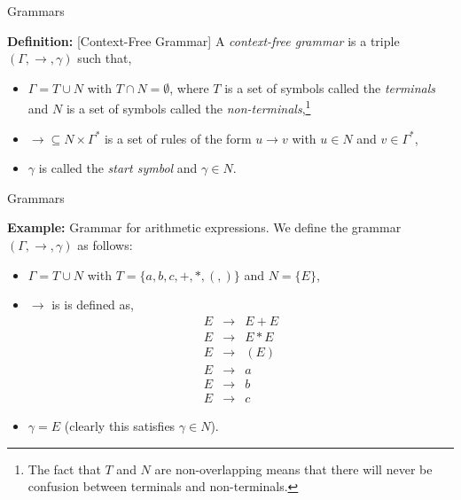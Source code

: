 \documentclass{beamer}
\begin{document}
\begin{frame}[fragile]{Grammars}

\small

{\bf Definition:} [Context-Free Grammar] A {\em context-free grammar} is a triple $(\Gamma,\rightarrow,\gamma)$ such that,
\begin{itemize}
\item
$\Gamma = T \cup N$ with $T\cap N = \emptyset$, where $T$ is a set of symbols called the {\em terminals} and $N$ is a set of symbols
called the {\em non-terminals},\footnote{The fact that $T$ and $N$ are non-overlapping means
that there will never be confusion between terminals and non-terminals.}
\item
$\rightarrow\subseteq N\times\Gamma^*$ is a set of rules of
the form $u \rightarrow v$ with $u\in N$ and $v\in\Gamma^*$,
\item
$\gamma$ is called the {\em start symbol} and $\gamma\in N$.
\end{itemize}
\end{frame}

\begin{frame}[fragile]{Grammars}

\small
{\bf Example:} Grammar for arithmetic expressions.  We define the grammar $(\Gamma, \rightarrow, \gamma)$ as follows:
\begin{itemize}
\item $\Gamma = T \cup N$ with $T = \{ a, b, c, +, *, (, )\}$ and $N=\{ E \}$,
\item $\rightarrow$ is is defined as,
{\scriptsize
\[
\begin{array}{rcl}
E & \rightarrow & E + E \\
E & \rightarrow & E * E \\
E & \rightarrow & ( E )\\
E & \rightarrow & a\\
E & \rightarrow & b\\
E & \rightarrow & c
\end{array}
\]
}
\item $\gamma = E$ (clearly this satisfies $\gamma\in N$).
\end{itemize}
\end{frame}
\end{document}
